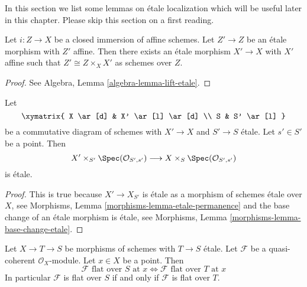\noindent
In this section we list some lemmas on \'etale localization which will be
useful later in this chapter. Please skip this section on a first reading.

\begin{lemma}
\label{lemma-lift-etale}
Let $i : Z \to X$ be a closed immersion of affine schemes.
Let $Z' \to Z$ be an \'etale morphism with $Z'$ affine.
Then there exists an \'etale morphism $X' \to X$ with $X'$
affine such that $Z' \cong Z \times_X X'$ as schemes over $Z$.
\end{lemma}

\begin{proof}
See
Algebra, Lemma \ref{algebra-lemma-lift-etale}.
\end{proof}

\begin{lemma}
\label{lemma-etale-at-point}
Let
$$
\xymatrix{
X \ar[d] & X' \ar[l] \ar[d] \\
S & S' \ar[l]
}
$$
be a commutative diagram of schemes with $X' \to X$ and $S' \to S$ \'etale.
Let $s' \in S'$ be a point. Then
$$
X' \times_{S'} \Spec(\mathcal{O}_{S', s'})
\longrightarrow
X \times_S \Spec(\mathcal{O}_{S', s'})
$$
is \'etale.
\end{lemma}

\begin{proof}
This is true because $X' \to X_{S'}$ is \'etale as a morphism of
schemes \'etale over $X$, see
Morphisms, Lemma \ref{morphisms-lemma-etale-permanence}
and the base change of an \'etale morphism is \'etale, see
Morphisms, Lemma \ref{morphisms-lemma-base-change-etale}.
\end{proof}

\begin{lemma}
\label{lemma-etale-flat-up-down}
Let $X \to T \to S$ be morphisms of schemes with $T \to S$ \'etale.
Let $\mathcal{F}$ be a quasi-coherent $\mathcal{O}_X$-module.
Let $x \in X$ be a point. Then
$$
\mathcal{F}\text{ flat over }S\text{ at }x
\Leftrightarrow
\mathcal{F}\text{ flat over }T\text{ at }x
$$
In particular $\mathcal{F}$ is flat over $S$ if and only if $\mathcal{F}$
is flat over $T$.
\end{lemma}

